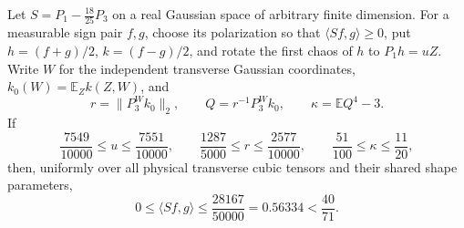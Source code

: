 \begin{proposition}
Let $S=P_1-\frac{18}{25}P_3$ on a real Gaussian space of arbitrary finite
dimension.  For a measurable sign pair $f,g$, choose its polarization so that
$\langle Sf,g\rangle\ge0$, put $h=(f+g)/2$, $k=(f-g)/2$, and rotate the first
chaos of $h$ to $P_1h=uZ$.  Write $W$ for the independent transverse Gaussian
coordinates, $k_0(W)=\mathbb E_Zk(Z,W)$, and
\[
 r=\|P_3^W k_0\|_2,\qquad Q=r^{-1}P_3^Wk_0,
 \qquad \kappa=\mathbb E Q^4-3.
\]
If
\[
 \frac{7549}{10000}\le u\le\frac{7551}{10000},\qquad
 \frac{1287}{5000}\le r\le\frac{2577}{10000},\qquad
 \frac{51}{100}\le\kappa\le\frac{11}{20},
\]
then, uniformly over all physical transverse cubic tensors and their shared
shape parameters,
\[
 0\le\langle Sf,g\rangle
 \le\frac{28167}{50000}=0.56334<\frac{40}{71}.
\]
\end{proposition}

